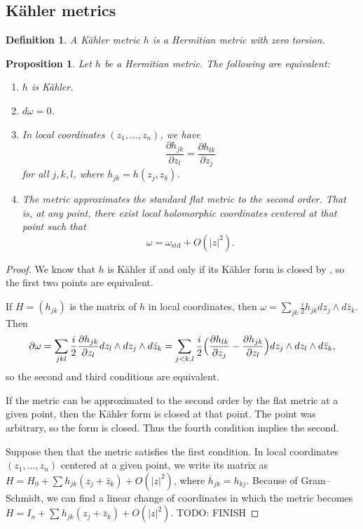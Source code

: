 \documentclass[10pt,a4paper]{article}
\newtheorem{prop}[theo]{Proposition}
\newtheorem{defi}[theo]{Definition}
\newtheorem*{proof}{Proof}
\begin{document}
\subsection{K\"ahler metrics}

\begin{defi}
A \emph{K\"ahler metric} $h$ is a Hermitian metric with zero torsion.
\end{defi}


\begin{prop}
Let $h$ be a Hermitian metric. The following are equivalent:
\begin{enumerate}
\item $h$ is K\"ahler.
\item $d\omega = 0$.
\item In local coordinates $(z_1,\ldots,z_n)$, we have
\[
\frac{\partial h_{jk}}{\partial z_l}
= \frac{\partial h_{lk}}{\partial z_j}
\]
for all $j,k,l$, where $h_{jk} = h(z_j,z_k)$.
\item The metric approximates the standard flat metric to the second order. That is, at any point, there exist local holomorphic coordinates centered at that point such that
\[
\omega = \omega_{\text{std}} + O(|z|^2).
\]
\end{enumerate}
\end{prop}

\begin{proof}
We know that $h$ is K\"ahler if and only if its K\"ahler form is closed by , so the first two points are equivalent.

If $H = (h_{jk})$ is the matrix of $h$ in local coordinates, then $\omega = \sum_{jk} \frac i2 h_{jk} dz_j \wedge d\bar z_k$. Then
\[
\partial\omega
= \sum_{jkl} \frac i2 \frac{\partial h_{jk}}{\partial z_l} dz_l \wedge dz_j \wedge d\bar z_k
= \sum_{j<k,l} \frac i2
\Bigl(
\frac{\partial h_{lk}}{\partial z_j}
- \frac{\partial h_{jk}}{\partial z_l}
\Bigr)
dz_j \wedge dz_l \wedge d\bar z_k,
\]
so the second and third conditions are equivalent.

If the metric can be approximated to the second order by the flat metric at a given point, then the K\"ahler form is closed at that point. The point was arbitrary, so the form is closed. Thus the fourth condition implies the second.

Suppose then that the metric satisfies the first condition. In local coordinates $(z_1,\ldots,z_n)$ centered at a given point, we write its matrix as $H = H_0 + \sum h_{jk}(z_j + \bar z_k) + O(|z|^2)$, where $\overline h_{jk} = h_{kj}$. Because of Gram--Schmidt, we can find a linear change of coordinates in which the metric becomes $H = I_n + \sum h_{jk}(z_j + \bar z_k) + O(|z|^2)$.
TODO: FINISH
\end{proof}
\end{document}
